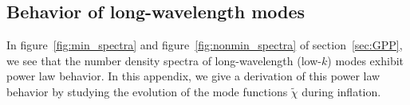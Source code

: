 \documentclass[11pt,a4paper]{article}
\newcommand{\fref}[1]{figure~\ref{#1}}
\newcommand{\sref}[1]{section~\ref{#1}}
\begin{document}
\begin{appendix}

\section{Behavior of long-wavelength modes}
\label{app:discussion_of_eoms}

In \fref{fig:min_spectra} and \fref{fig:nonmin_spectra} of \sref{sec:GPP}, we see that the number density spectra of long-wavelength (low-$k$) modes exhibit power law behavior.  In this appendix, we give a derivation of this power law behavior by studying the evolution of the mode functions $\tilde{\chi}$ during inflation.  


\end{appendix}
\end{document}
